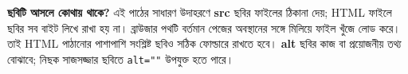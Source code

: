 \textbf{ছবিটি আসলে কোথায় থাকে?} এই পাঠের সাধারণ উদাহরণে \textbf{src} ছবির ফাইলের ঠিকানা দেয়; HTML ফাইলে ছবির সব বাইট লিখে রাখা হয় না। ব্রাউজার পথটি বর্তমান পেজের অবস্থানের সঙ্গে মিলিয়ে ফাইল খুঁজে লোড করে। তাই HTML পাঠানোর পাশাপাশি সংশ্লিষ্ট ছবিও সঠিক ফোল্ডারে রাখতে হবে। \textbf{alt} ছবির কাজ বা প্রয়োজনীয় তথ্য বোঝাবে; নিছক সাজসজ্জার ছবিতে \texttt{alt=""} উপযুক্ত হতে পারে।
